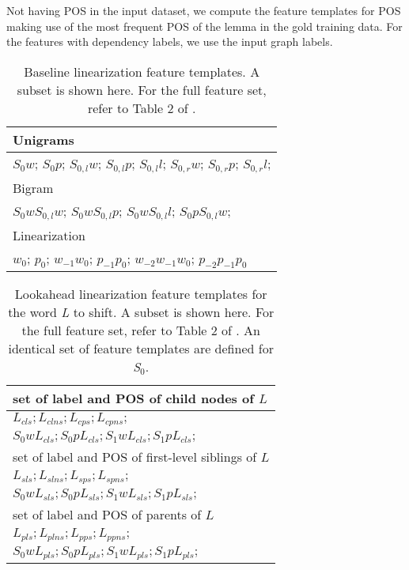 \documentclass[11pt]{article}
\begin{document}
Not having POS in the input dataset, we compute the feature templates for POS making use of the most frequent POS of the lemma in the gold training data. For the features with dependency labels, we use the input graph labels. 

\begin{table}[t]
\centering
\footnotesize
\begin{tabularx}{.45\textwidth}{X}

  \hline
  Unigrams \\

  \hline
  $S_0w$; $S_0 p$; $S_{0,l} w$;  $S_{0,l} p$;  $S_{0,l} l$;   $S_{0,r} w$;  $S_{0,r} p$;  $S_{0,r} l$;  \\


\hline \hline
  Bigram \\
  \hline
  $S_{0} w S_{0,l} w$; $S_{0} w S_{0,l} p$; $S_{0} w S_{0,l} l$; $S_{0} p S_{0,l} w$;\\ 
\hline \hline
Linearization \\
  \hline
  $ w_0$; $p_0$; $w_{-1}w_0$; $p_{-1}p_0$; $w_{-2}w_{-1}w_0$; $p_{-2}p_{-1}p_0$\\
\hline

\end{tabularx}
\caption{Baseline linearization feature templates. A subset is shown here. For the full feature set, refer to Table 2 of .}
\label{tab:features-templates-standard}
\end{table}



\begin{table}[t]
\centering
\footnotesize
\begin{tabularx}{.45\textwidth}{X}
\hline 
set of label and POS of child nodes of $L$\\ 
\hline 
$L_{cls};L_{clns};L_{cps};L_{cpns};$\\
$S_0wL_{cls};S_0pL_{cls};S_1wL_{cls};S_1pL_{cls};$\\
\hline 
\hline  
set of label and POS of first-level siblings of $L$\\ 
\hline 
$L_{sls};L_{slns};L_{sps};L_{spns};$\\
$S_0wL_{sls};S_0pL_{sls};S_1wL_{sls};S_1pL_{sls};$\\
\hline 
\hline  
set of label and POS of parents of $L$\\ 
\hline 
$L_{pls};L_{plns};L_{pps};L_{ppns};$\\
$S_0wL_{pls};S_0pL_{pls};S_1wL_{pls};S_1pL_{pls};$\\
\hline 

\end{tabularx}
\caption{Lookahead linearization feature templates for the word {\it L} to shift. A subset is shown here. For the full feature set, refer to Table 2 of . An identical set of feature templates are defined for {\it S}$_0$.}
\label{tab:features-templates}
\end{table}
\end{document}

